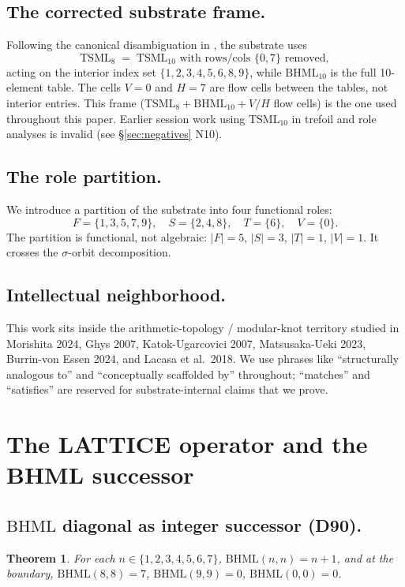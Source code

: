 \documentclass[11pt,reqno]{amsart}
\theoremstyle{plain}
\newtheorem{theorem}{Theorem}[section]
\theoremstyle{definition}
\theoremstyle{remark}
\newcommand{\TS}{\mathrm{TSML}}
\newcommand{\BH}{\mathrm{BHML}}
\newcommand{\sig}{\sigma}
\begin{document}
\subsection{The corrected substrate frame.}
Following the canonical disambiguation in \cite{SandersGishFourCore}, the
substrate uses
\[
  \TS_{8} \;=\; \TS_{10}\text{ with rows/cols }\{0, 7\}\text{ removed},
\]
acting on the interior index set $\{1, 2, 3, 4, 5, 6, 8, 9\}$, while
$\BH_{10}$ is the full 10-element table. The cells $V = 0$ and $H = 7$
are flow cells between the tables, not interior entries. This frame
($\TS_{8} + \BH_{10} + V/H$ flow cells) is the one used throughout this
paper. Earlier session work using $\TS_{10}$ in trefoil and role
analyses is invalid (see \S\ref{sec:negatives} N10).

\subsection{The role partition.}
We introduce a partition of the substrate into four functional roles:
\[
  F = \{1, 3, 5, 7, 9\},
  \quad S = \{2, 4, 8\},
  \quad T = \{6\},
  \quad V = \{0\}.
\]
The partition is functional, not algebraic: $|F| = 5$, $|S| = 3$,
$|T| = 1$, $|V| = 1$. It crosses the $\sig$-orbit decomposition.

\subsection{Intellectual neighborhood.}
This work sits inside the arithmetic-topology / modular-knot territory
studied in Morishita 2024, Ghys 2007, Katok-Ugarcovici 2007,
Matsusaka-Ueki 2023, Burrin-von Essen 2024, and Lacasa et al.\ 2018.
We use phrases like ``structurally analogous to'' and ``conceptually
scaffolded by'' throughout; ``matches'' and ``satisfies'' are reserved
for substrate-internal claims that we prove.

\section{The LATTICE operator and the BHML successor}

\subsection{$\BH$ diagonal as integer successor (D90).}
\begin{theorem}\label{thm:bh-diagonal}
For each $n \in \{1, 2, 3, 4, 5, 6, 7\}$, $\BH(n, n) = n + 1$, and at
the boundary, $\BH(8, 8) = 7$, $\BH(9, 9) = 0$, $\BH(0, 0) = 0$.
\end{theorem}
\end{document}
